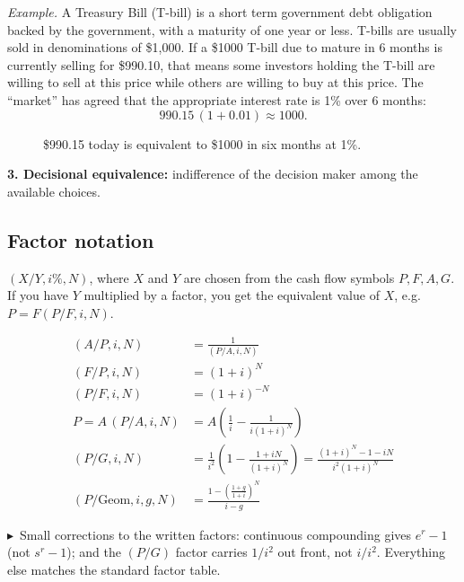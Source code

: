 \documentclass[11pt]{article}
\newcommand{\term}[1]{\textbf{\textcolor{cTerm}{#1}}}
\newcommand{\fillnote}[1]{\begin{noteboxenv}\small\textcolor{cNote}{$\blacktriangleright$}\ #1\end{noteboxenv}}
\newcommand{\up}[3]{\draw[-{Latex[length=2mm]},very thick,posflow] (#1,0) -- (#1,#2) node[above]{\small #3};}
\begin{document}
\textit{Example.} A Treasury Bill (T-bill) is a short term government debt
obligation backed by the government, with a maturity of one year or less.
T-bills are usually sold in denominations of \$1{,}000. If a \$1000 T-bill due to
mature in 6 months is currently selling for \$990.10, that means some investors
holding the T-bill are willing to sell at this price while others are willing to
buy at this price. The ``market'' has agreed that the appropriate interest rate
is 1\% over 6 months:
\[
990.15\,(1 + 0.01) \approx 1000.
\]
\begin{figure}[h]
\centering
{}
\caption*{\$990.15 today is equivalent to \$1000 in six months at 1\%.}
\end{figure}

\textbf{3. \term{Decisional equivalence}:} indifference of the decision maker
among the available choices.

\subsection*{Factor notation}
$(X/Y, i\%, N)$, where $X$ and $Y$ are chosen from the cash flow symbols
$P, F, A, G$. If you have $Y$ multiplied by a factor, you get the equivalent
value of $X$, e.g.\ $P = F(P/F, i, N)$.

\begin{align*}
(A/P, i, N) &= \frac{1}{(P/A, i, N)}\\[2pt]
(F/P, i, N) &= (1+i)^{N}\\[2pt]
(P/F, i, N) &= (1+i)^{-N}\\[2pt]
P = A\,(P/A, i, N) &= A\!\left(\frac{1}{i} - \frac{1}{i(1+i)^{N}}\right)\\[2pt]
(P/G, i, N) &= \frac{1}{i^{2}}\left(1 - \frac{1+iN}{(1+i)^{N}}\right)
             = \frac{(1+i)^{N} - 1 - iN}{i^{2}(1+i)^{N}}\\[2pt]
(P/\mathrm{Geom}, i, g, N) &= \frac{1 - \left(\frac{1+g}{1+i}\right)^{N}}{i - g}
\end{align*}

\fillnote{Small corrections to the written factors: continuous compounding gives
$e^{r}-1$ (not $s^{r}-1$); and the $(P/G)$ factor carries $1/i^{2}$ out front,
not $i/i^{2}$. Everything else matches the standard factor table.}
\end{document}
